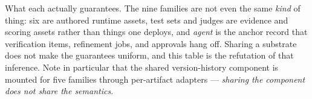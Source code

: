 
\begin{table}[tp]
\centering
\caption{What each \family actually guarantees. The nine families are not even
the same \emph{kind} of thing: six are authored runtime assets, test sets and
judges are evidence and scoring assets rather than things one deploys, and
\emph{agent} is the anchor record that verification items, refinement jobs, and
approvals hang off. Sharing a substrate does not make the guarantees uniform, and
this table is the refutation of that inference. Note in particular that the
shared version-history component is mounted for five families through per-artifact
adapters --- \emph{sharing the component does not share the semantics}.}
\label{tab:families}
\small
\setlength{\tabcolsep}{5pt}
\renewcommand{\arraystretch}{1.08}
\begin{cbwide}

\end{cbwide}
\end{table}
